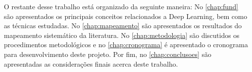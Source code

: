 O restante desse trabalho está organizado da seguinte maneira: No \autoref{chap:fund} são apresentados os principais conceitos relacionados a Deep Learning, bem como as técnicas estudadas. No \autoref{chap:mapeamento} são apresentados os resultados do mapeamento sistemático da literatura. No \autoref{chap:metodologia} são discutidos os procedimentos metodológicos e no \autoref{chap:cronograma} é apresentado o cronograma para desenvolvimento deste projeto. Por fim, no \autoref{chap:conclusoes} são apresentadas as considerações finais acerca deste trabalho.

